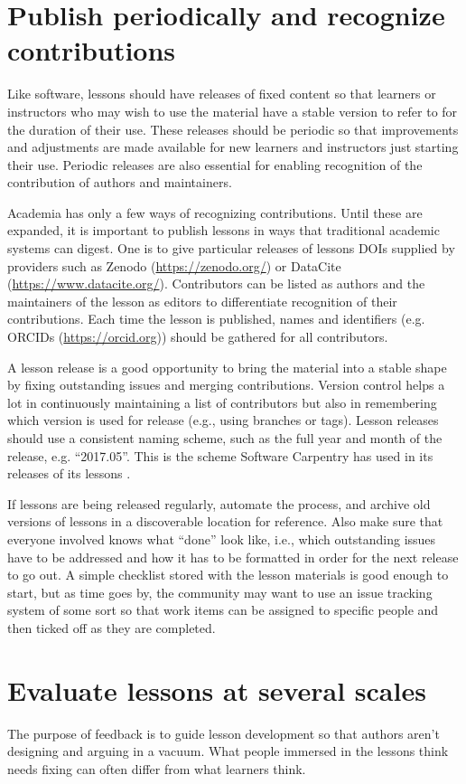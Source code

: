 \documentclass[10pt,letterpaper]{article}
\newcommand{\rulemajor}[1]{\section{#1}}
\begin{document}
\rulemajor{Publish periodically and recognize contributions}

Like software,
lessons should have releases of fixed content
so that learners or instructors who may wish to use the material have a stable version to refer to
for the duration of their use.
These releases should be periodic
so that improvements and adjustments are made available
for new learners and instructors just starting their use.
Periodic releases are also essential
for enabling recognition of the contribution of authors and maintainers.

Academia has only a few ways of recognizing contributions.
Until these are expanded,
it is important to publish lessons in ways that traditional academic systems can digest.
One is to give particular releases of lessons
DOIs supplied by providers such as Zenodo (\url{https://zenodo.org/})
or DataCite (\url{https://www.datacite.org/}).
Contributors can be listed as authors
and the maintainers of the lesson as editors
to differentiate recognition of their contributions.
Each time the lesson is published,
names and identifiers (e.g. ORCIDs (\url{https://orcid.org}))
should be gathered for all contributors.

A lesson release is a good opportunity to bring the material into a stable shape
by fixing outstanding issues and merging contributions.
Version control helps a lot in continuously maintaining a list of contributors
but also in remembering which version is used for release
(e.g., using branches or tags).
Lesson releases should use a consistent naming scheme,
such as the full year and month of the release,
e.g. ``2017.05''.
This is the scheme Software Carpentry has used in
its releases of its lessons \cite{shell2015,shell2017}.

If lessons are being released regularly,
automate the process,
and archive old versions of lessons in a discoverable location for reference.
Also make sure that everyone involved knows what ``done'' look like,
i.e.,
which outstanding issues have to be addressed
and how it has to be formatted
in order for the next release to go out.
A simple checklist stored with the lesson materials is good enough to start,
but as time goes by,
the community may want to use an issue tracking system of some sort
so that work items can be assigned to specific people
and then ticked off as they are completed.

\rulemajor{Evaluate lessons at several scales}

The purpose of feedback is to guide lesson development
so that authors aren't designing and arguing in a vacuum.
What people immersed in the lessons think needs fixing
can often differ from what learners think.
\end{document}
